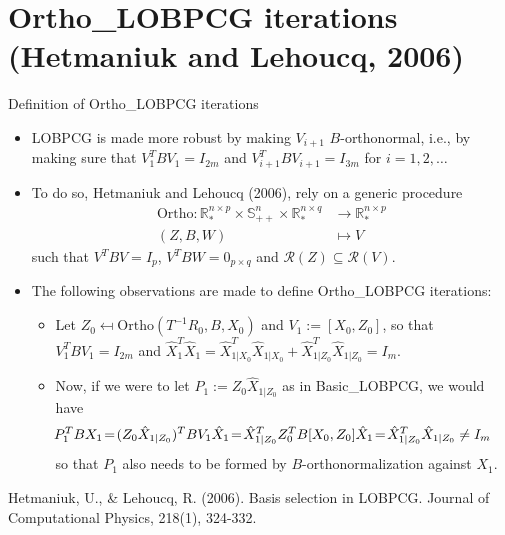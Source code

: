 \documentclass[t,usepdftitle=false]{beamer}
\begin{document}
\section{Ortho\_LOBPCG iterations (Hetmaniuk and Lehoucq, 2006)}

\begin{frame}{Definition of Ortho\_LOBPCG iterations}
	\begin{itemize}
	\item LOBPCG is made more robust by making $V_{i+1}$ $B$-orthonormal, i.e., by\\ 
	making sure that $V_{1}^TBV_{1}=I_{2m}$ and $V_{i+1}^TBV_{i+1}=I_{3m}$ for $i=1,2,\dots$
	\item To do so, Hetmaniuk and Lehoucq (2006), rely on a generic procedure
	\begin{align*}
	\text{Ortho}:
	\mathbb{R}_*^{n\times p}\times \mathbb{S}_{++}^n\times \mathbb{R}_*^{n\times q}&\rightarrow \mathbb{R}_*^{n\times p}\\
	(Z,B,W)&\mapsto V
	\end{align*}
	such that $V^TBV=I_{p}$, $V^TBW=0_{p\times q}$ and $\mathcal{R}(Z)\subseteq\mathcal{R}(V)$.
	\item The following observations are made to define Ortho\_LOBPCG iterations:
	\begin{itemize}
    \item Let $Z_0\mapsfrom\text{Ortho}(T^{-1}R_0,B,X_0)$ and $V_{1}:=[X_0,Z_0]$,
	so that $V_1^TBV_1=I_{2m}$ and $\hat{X}_1^T\hat{X}_1=\hat{X}_{1|X_0}^T\hat{X}_{1|X_0}+\hat{X}_{1|Z_0}^T\hat{X}_{1|Z_0}=I_m$.
	\item Now, if we were to let $P_1:=Z_0\hat{X}_{1|Z_0}$ as in Basic\_LOBPCG, we would have 
	\begin{align*}
	\hspace{-.55cm}
	P_1^TBX_1
	\!=\!(Z_0\hat{X}_{1|Z_0})^TBV_1\hat{X}_1
	\!=\!\hat{X}_{1|Z_0}^TZ_0^TB[X_0,Z_0]\hat{X}_1
	\!=\!\hat{X}_{1|Z_0}^T\hat{X}_{1|Z_0}
	\neq I_m
	\end{align*}
	so that $P_1$ also needs to be formed by $B$-orthonormalization against $X_1$.
	\end{itemize}
	\end{itemize}
	\medskip
	\tiny{Hetmaniuk, U., \& Lehoucq, R. (2006). Basis selection in LOBPCG. Journal of Computational Physics, 218(1), 324-332.}
\end{frame}
\end{document}
